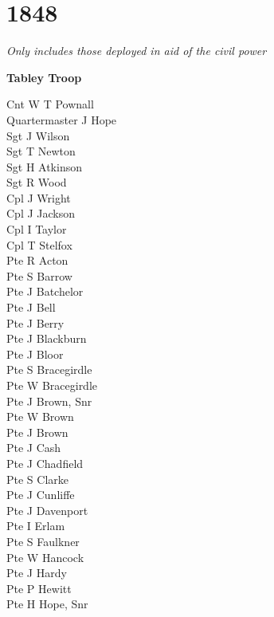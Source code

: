 \chapter*{1848}

\begin{center}
  \textit{Only includes those deployed in aid of the civil power}
\end{center}

\begin{center}
  \Large
  \textbf{Tabley Troop}
\end{center}

\begin{multicols}{2}
  \noindent
  Cnt W T Pownall \\
  Quartermaster J Hope \\
  Sgt J Wilson \\
  Sgt T Newton \\
  Sgt H Atkinson \\
  Sgt R Wood \\
  Cpl J Wright \\
  Cpl J Jackson \\
  Cpl I Taylor \\
  Cpl T Stelfox \\
  Pte R Acton \\
  Pte S Barrow \\
  Pte J Batchelor \\
  Pte J Bell \\
  Pte J Berry \\
  Pte J Blackburn \\
  Pte J Bloor \\
  Pte S Bracegirdle \\
  Pte W Bracegirdle \\
  Pte J Brown, Snr \\
  Pte W Brown \\
  Pte J Brown \\
  Pte J Cash \\
  Pte J Chadfield \\
  Pte S Clarke \\
  Pte J Cunliffe \\
  Pte J Davenport \\
  Pte I Erlam \\
  Pte S Faulkner \\
  Pte W Hancock \\
  Pte J Hardy \\
  Pte P Hewitt \\
  Pte H Hope, Snr \\

\end{multicols}
